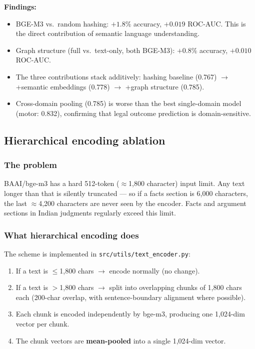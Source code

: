 \documentclass[12pt,a4paper]{article}
\begin{document}
\textbf{Findings:}
\begin{itemize}[noitemsep]
  \item BGE-M3 vs.\ random hashing: $+1.8\%$ accuracy, $+0.019$ ROC-AUC. This is the direct contribution of semantic language understanding.
  \item Graph structure (full vs.\ text-only, both BGE-M3): $+0.8\%$ accuracy, $+0.010$ ROC-AUC.
  \item The three contributions stack additively: hashing baseline (0.767) $\to$ +semantic embeddings (0.778) $\to$ +graph structure (0.785).
  \item Cross-domain pooling (0.785) is worse than the best single-domain model (motor: 0.832), confirming that legal outcome prediction is domain-sensitive.
\end{itemize}

\subsection{Hierarchical encoding ablation}
\label{sec:hier_enc}

\subsubsection*{The problem}

BAAI/bge-m3 has a hard 512-token ($\approx$1{,}800 character) input limit. Any text longer than that is silently truncated — so if a facts section is 6{,}000 characters, the last $\approx$4{,}200 characters are never seen by the encoder. Facts and argument sections in Indian judgments regularly exceed this limit.

\subsubsection*{What hierarchical encoding does}

The scheme is implemented in \texttt{src/utils/text\_encoder.py}:

\begin{enumerate}[noitemsep]
  \item If a text is $\leq$1{,}800 chars $\to$ encode normally (no change).
  \item If a text is $>$1{,}800 chars $\to$ split into overlapping chunks of 1{,}800 chars each (200-char overlap, with sentence-boundary alignment where possible).
  \item Each chunk is encoded independently by bge-m3, producing one 1{,}024-dim vector per chunk.
  \item The chunk vectors are \textbf{mean-pooled} into a single 1{,}024-dim vector.
\end{enumerate}
\end{document}

